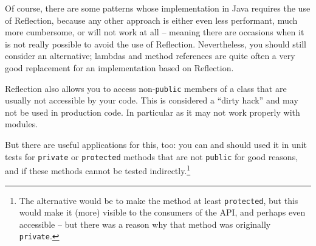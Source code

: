 \documentclass[11pt,a4paper, titlepage, parskip=half, headsepline, footsepline, cleardoublepage=current, headheight=1cm]{scrbook}
\begin{document}
Of course, there are some patterns whose implementation in Java requires the use of Reflection, because any other approach is either even less performant, much more cumbersome, or will not work at all – meaning there are occasions when it is not really possible to avoid the use of Reflection. Nevertheless, you should still consider an alternative; lambdas\autocite{ORACLE_DOC_LANGUAGE_SPECIFICATION:LambdaExpressions} and method references\autocite{ORACLE_DOC_LANGUAGE_SPECIFICATION:MethodReference} are quite often a very good replacement for an implementation based on Reflection.

Reflection also allows you to access non-\lstinline|public| members of a class that are usually not accessible by your code. This is considered a “dirty hack” and may not be used in production code. In particular as it may not work properly with modules.

But there are useful applications for this, too: you can and should used it in unit tests for \lstinline|private| or \lstinline|protected| methods that are not \lstinline|public| for good reasons, and if these methods cannot be tested indirectly.\footnote{The alternative would be to make the method at least \lstinline|protected|, but this would make it (more) visible to the consumers of the API, and perhaps even accessible – but there was a reason why that method was originally \lstinline|private|.}
\end{document}
